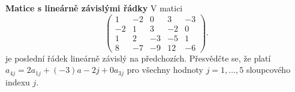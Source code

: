 \wikitextrule
\begin{example}\label{MAI:exam082} 
  \textbf{Matice s lineárně závislými řádky}\newline\small
  V matici
  \begin{equation*}
    \begin{pmatrix}
        1 & -2 &  0 &  3 & -3  \\
       -2 &  1 &  3 & -2 &  0  \\
        1 &  2 & -3 & -5 &  1  \\
        8 & -7 & -9 & 12 & -6 
    \end{pmatrix}.
  \end{equation*}
  je poslední řádek lineárně závislý na předchozích. Přesvědčte se, že platí \(a_{4j}= 2a_{1j} + 
  (-3)a - {2j} + 0a_{3j}\) pro všechny hodnoty \(j = 1, \ldots, 5\) sloupcového indexu \(j\).
  \normalsize
\end{example}